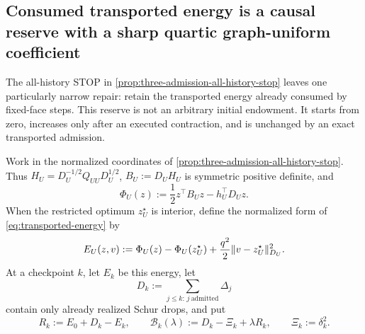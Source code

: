 \subsection{Consumed transported energy is a causal reserve with a sharp
quartic graph-uniform coefficient}
\label{sec:consumed-energy-reserve}

The all-history STOP in
\cref{prop:three-admission-all-history-stop} leaves one particularly narrow
repair: retain the transported energy already consumed by fixed-face steps.
This reserve is not an arbitrary initial endowment.  It starts from zero,
increases only after an executed contraction, and is unchanged by an exact
transported admission.

Work in the normalized coordinates of
\cref{prop:three-admission-all-history-stop}.  Thus
$H_U=D_U^{-1/2}Q_{UU}D_U^{1/2}$, $B_U:=D_UH_U$ is symmetric positive
definite, and
\begin{equation*}
 \Phi_U(z):=\frac12z^\top B_Uz-h_U^\top D_Uz.
\end{equation*}
When the restricted optimum $z_U^\star$ is interior, define the normalized
form of \cref{eq:transported-energy} by
\begin{equation}
 E_U(z,v):=\Phi_U(z)-\Phi_U(z_U^\star)
       +\frac{q^2}{2}\lVert v-z_U^\star\rVert_{D_U}^2.
 \label{eq:consumed-reserve-energy}
\end{equation}
At a checkpoint $k$, let $E_k$ be this energy, let
\begin{equation*}
 D_k:=\sum_{j\leq k:\,j\ \mathrm{admitted}}\Delta_j
\end{equation*}
contain only already realized Schur drops, and put
\begin{equation}
 R_k:=E_0+D_k-E_k,
 \qquad
 \mathcal B_k(\lambda):=D_k-\Xi_k+\lambda R_k,
 \qquad \Xi_k:=\delta_k^2.
 \label{eq:consumed-reserve-ledger}
\end{equation}

